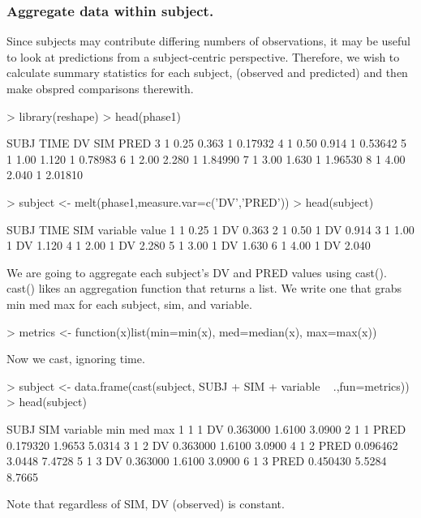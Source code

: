 \subsubsection{Aggregate data within subject.}
Since subjects may contribute differing numbers of observations, it may
be useful to look at predictions from a subject-centric perspective.
Therefore, we wish to calculate summary statistics for each subject, 
(observed and predicted) and then make obspred comparisons therewith.
\begin{Schunk}
\begin{Sinput}
> library(reshape)
> head(phase1)
\end{Sinput}
\begin{Soutput}
  SUBJ TIME    DV SIM    PRED
3    1 0.25 0.363   1 0.17932
4    1 0.50 0.914   1 0.53642
5    1 1.00 1.120   1 0.78983
6    1 2.00 2.280   1 1.84990
7    1 3.00 1.630   1 1.96530
8    1 4.00 2.040   1 2.01810
\end{Soutput}
\begin{Sinput}
> subject <- melt(phase1,measure.var=c('DV','PRED'))
> head(subject)
\end{Sinput}
\begin{Soutput}
  SUBJ TIME SIM variable value
1    1 0.25   1       DV 0.363
2    1 0.50   1       DV 0.914
3    1 1.00   1       DV 1.120
4    1 2.00   1       DV 2.280
5    1 3.00   1       DV 1.630
6    1 4.00   1       DV 2.040
\end{Soutput}
\end{Schunk}
We are going to aggregate each subject's DV and PRED values using cast().
cast() likes an aggregation function that returns a list.
We write one that grabs min med max for each subject, sim, and variable.
\begin{Schunk}
\begin{Sinput}
> metrics <- function(x)list(min=min(x), med=median(x), max=max(x))
\end{Sinput}
\end{Schunk}
Now we cast, ignoring time.
\begin{Schunk}
\begin{Sinput}
> subject <- data.frame(cast(subject, SUBJ + SIM + variable ~ .,fun=metrics))
> head(subject)
\end{Sinput}
\begin{Soutput}
  SUBJ SIM variable      min    med    max
1    1   1       DV 0.363000 1.6100 3.0900
2    1   1     PRED 0.179320 1.9653 5.0314
3    1   2       DV 0.363000 1.6100 3.0900
4    1   2     PRED 0.096462 3.0448 7.4728
5    1   3       DV 0.363000 1.6100 3.0900
6    1   3     PRED 0.450430 5.5284 8.7665
\end{Soutput}
\end{Schunk}
Note that regardless of SIM, DV (observed) is constant.

